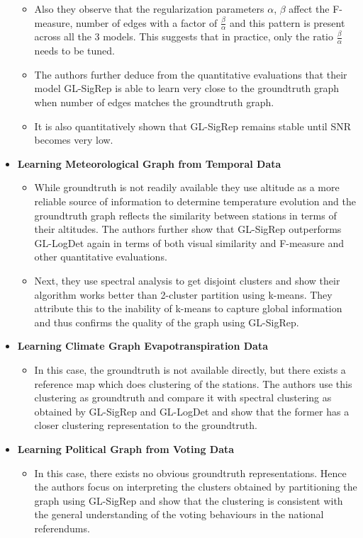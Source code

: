 \documentclass{article}
\begin{document}
\begin{itemize}
\begin{itemize}
  \item Also they observe that the regularization parameters $\alpha$, $\beta$ affect the F-measure, number of edges with a factor of $\frac{\beta}{\alpha}$ and this pattern is present across all the 3 models. This suggests that in practice, only the ratio $\frac{\beta}{\alpha}$ needs to be tuned.
  \item The authors further deduce from the quantitative evaluations that their model GL-SigRep is able to learn very close to the groundtruth graph when number of edges matches the groundtruth graph.
  \item It is also quantitatively shown that GL-SigRep remains stable until SNR becomes very low.
  \end{itemize}
\item \textbf{Learning Meteorological Graph from Temporal Data}
  \begin{itemize}
  \item While groundtruth is not readily available they use altitude as a more reliable source of information to determine temperature evolution and the groundtruth graph reflects the similarity between stations in terms of their altitudes. The authors further show that GL-SigRep outperforms GL-LogDet again in terms of both visual similarity and F-measure and other quantitative evaluations.
  \item Next, they use spectral analysis to get disjoint clusters and show their algorithm works better than 2-cluster partition using k-means. They attribute this to the inability of k-means to capture global information and thus confirms the quality of the graph using GL-SigRep.
  \end{itemize}
\item \textbf{Learning Climate Graph Evapotranspiration Data}
  \begin{itemize}
  \item In this case, the groundtruth is not available directly, but there exists a reference map which does clustering of the stations. The authors use this clustering as groundtruth and compare it with spectral clustering as obtained by GL-SigRep and GL-LogDet and show that the former has a closer clustering representation to the groundtruth.
  \end{itemize}

\item \textbf{Learning Political Graph from Voting Data}
  \begin{itemize}
  \item In this case, there exists no obvious groundtruth representations. Hence the authors focus on interpreting the clusters obtained by partitioning the graph using GL-SigRep and show that the clustering is consistent with the general understanding of the voting behaviours in the national referendums.
  \end{itemize}
\end{itemize}
\end{document}

